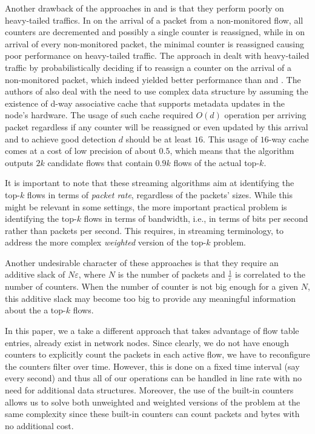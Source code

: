 Another drawback of the approaches in \cite{Demaine2002} and \cite{Metwally2005} is that they perform poorly on heavy-tailed traffics. In \cite{Demaine2002} on the arrival of a packet from a non-monitored flow, all counters are decremented and possibly a single counter is reassigned, while in \cite{Metwally2005} on arrival of every non-monitored packet, the minimal counter is reassigned causing poor performance on heavy-tailed traffic. The approach in \cite{Ben-Basat2017} dealt with heavy-tailed traffic by probabilistically deciding if to reassign a counter on the arrival of a non-monitored packet, which indeed yielded better performance than \cite{Demaine2002} and \cite{Metwally2005}. The authors of \cite{Ben-Basat2017} also deal with the need to use complex data structure by assuming the existence of d-way associative cache that supports metadata updates in the node’s hardware. The usage of such cache required $O(d)$ operation per arriving packet regardless if any counter will be reassigned or even updated by this arrival and to achieve good detection $d$ should be at least $16$. This usage of $16$-way cache comes at a cost of low precision of about $0.5$, which means that the algorithm outputs $2k$ candidate flows that contain $0.9k$ flows of the actual top-$k$.


It is important to note that these streaming algorithms aim at identifying the top-$k$ flows in terms of {\em packet rate}, regardless of the packets' sizes. While this might be relevant in some settings, the more important practical problem is identifying the top-$k$ flows in terms of bandwidth, i.e., in terms of bits per second rather than packets per second. This requires, in streaming terminology, to address the more complex {\em weighted} version of the top-$k$ problem.%

Another undesirable character of these approaches is that they require an additive slack of $N\varepsilon$, where $N$ is the number of packets and $\frac{1}{\varepsilon}$ is correlated to the number of counters. When the number of counter is not big enough for a given $N$, this additive slack may become too big to provide any meaningful information about the  a top-$k$ flows.

In this paper, we a take a different approach that takes advantage of flow table entries, already exist in network nodes. Since clearly, we do not have enough counters to explicitly count the packets in each active flow, we have to reconfigure the counters filter over time. However, this is done on a fixed time interval (say every second) and thus all of our operations can be handled in line rate with no need for additional data structures. Moreover, the use of the built-in counters allows us to solve both unweighted and weighted versions of the problem at the same complexity since these built-in counters can count packets and bytes with no additional cost.

